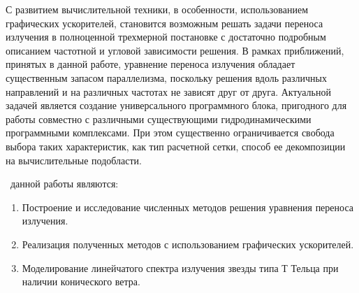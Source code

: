 С развитием вычислительной техники, в особенности, использованием графических ускорителей, становится возможным решать задачи переноса излучения в полноценной трехмерной постановке с достаточно подробным описанием частотной и угловой зависимости решения. В рамках приближений, принятых в данной работе, уравнение переноса излучения обладает существенным запасом параллелизма, поскольку решения вдоль различных направлений и на различных частотах не зависят друг от друга. Актуальной задачей является создание универсального программного блока, пригодного для работы совместно с различными существующими гидродинамическими программными комплексами. При этом существенно ограничивается свобода выбора таких характеристик, как тип расчетной сетки, способ ее декомпозиции на вычислительные подобласти.

 \aim\ данной работы являются:
\begin{enumerate}
  \item Построение и исследование численных методов решения уравнения переноса излучения.
  \item Реализация полученных методов с использованием графических ускорителей.
  \item Моделирование линейчатого спектра излучения звезды типа Т Тельца при наличии конического ветра. 
\end{enumerate}

